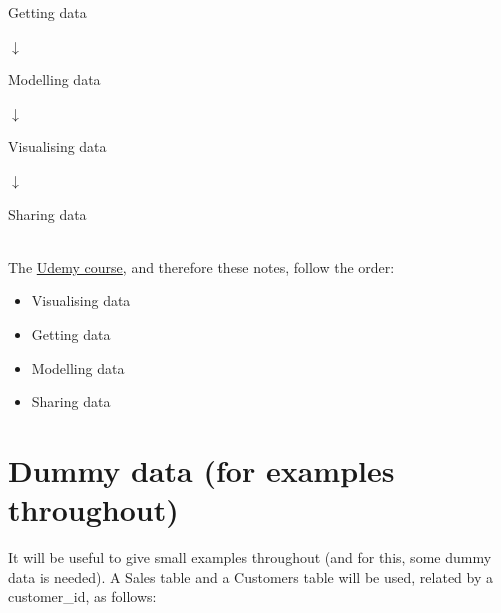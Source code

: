 \documentclass[10pt, openany, twocolumn]{book}
\begin{document}
\begin{center}
    \begin{tcolorbox}[colback=orange!20!white, colframe=yellow!40!gray, width=0.5\columnwidth, halign=center]
    Getting data
    \end{tcolorbox}
    $\downarrow$
    \begin{tcolorbox}[colback=orange!20!white, colframe=yellow!40!gray, width=0.5\columnwidth, halign=center]
    Modelling data
    \end{tcolorbox}
    $\downarrow$    
    \begin{tcolorbox}[colback=orange!20!white, colframe=yellow!40!gray, width=0.5\columnwidth, halign=center]
    Visualising data
    \end{tcolorbox}
    $\downarrow$    
    \begin{tcolorbox}[colback=orange!20!white, colframe=yellow!40!gray, width=0.5\columnwidth, halign=center]
    Sharing data
    \end{tcolorbox}
\end{center}\phantom{}\\

The \href{https://www.udemy.com/course/70-778-analyzing-and-visualizing-data-with-power-bi/}{Udemy course}, and therefore these notes, follow the order:
\begin{itemize}
    \item Visualising data
    \item Getting data
    \item Modelling data 
    \item Sharing data
\end{itemize}   

\newpage
\section{Dummy data (for examples throughout)}

It will be useful to give small examples throughout (and for this, some dummy data is needed). A Sales table and a Customers table will be used, related by a customer\_id, as follows:
\end{document}
